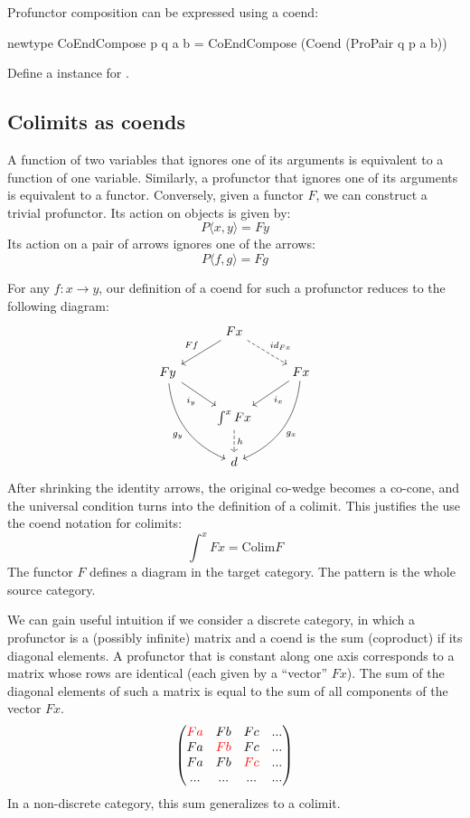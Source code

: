 \documentclass[DaoFP]{subfiles}
\begin{document}
\begin{exercise}
Profunctor composition can be expressed using a coend:
\begin{haskell}
newtype CoEndCompose p q a b = CoEndCompose (Coend (ProPair q p a b))
\end{haskell}
Define a  instance for .
\end{exercise}

\subsection{Colimits as coends}
A function of two variables that ignores one of its arguments is equivalent to a function of one variable. Similarly, a profunctor that ignores one of its arguments is equivalent to a functor. Conversely, given a functor $F$, we can construct a trivial profunctor. Its action on objects is given by:
\[P \langle x, y \rangle = F y \]
Its action on a pair of arrows ignores one of the arrows:
\[P \langle f, g \rangle = F g \]

For any   $f \colon x \to y$, our definition of a coend for such a profunctor reduces to the following diagram:
\[
 \begin{tikzcd}
 & F x
 \arrow[ld, "F f"']
 \arrow[rd, dashed, "id_{F x}"]
 \\
 F y
 \arrow[dr, "i_y"']
 \arrow[ddr, bend right,  "g_y"']
 && F x
 \arrow[dl, "i_x"]
 \arrow[ddl, bend left,  "g_x"]
 \\
 &\int^x F x
 \arrow[d, dashed, "h"]
 \\
 &d
 \end{tikzcd}
\]
After shrinking the identity arrows, the original co-wedge becomes a co-cone, and the universal condition turns into the definition of a colimit. This justifies the use the coend notation for colimits:
\[ \int^x F x = \text{Colim} F \]
The functor $F$ defines a diagram in the target category. The pattern is the whole source category.

We can gain useful intuition if we consider a discrete category, in which a profunctor is a (possibly infinite) matrix and a coend is the sum (coproduct) if its diagonal elements. A profunctor that is constant along one axis corresponds to a matrix whose rows are identical (each given by a ``vector'' $F x$). The sum of the diagonal elements of such a matrix is equal to the sum of all components of the vector $F x$.
\[
\begin{pmatrix}
\color{red} F a & F b & F c & ... \\
F a & \color{red}F b & F c & ...\\
F a & F b &\color{red}F c & ...\\
... & ... & ... & ...
\end{pmatrix}
\]
In a non-discrete category, this sum generalizes to a colimit.
\end{document}
